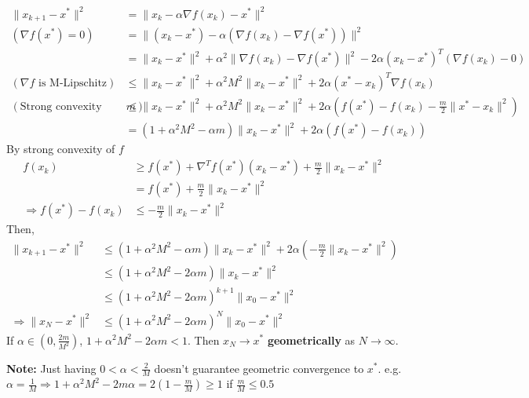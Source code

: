 \documentclass[11pt,a4paper]{article}
\begin{document}
\begin{equation}
    \begin{aligned}
        \|x_{k+1}-x^*\|^2&=\|x_k-\alpha \nabla f(x_k)-x^*\|^2\\
        (\nabla f(x^*)=0)\quad \quad &=\|(x_k-x^*)-\alpha (\nabla f(x_k)-\nabla f(x^*))\|^2\\
        &=\|x_k-x^*\|^2+\alpha^2\|\nabla f(x_k)-\nabla f(x^*)\|^2-2\alpha(x_k-x^*)^T(\nabla f(x_k)-0)\\
        (\nabla f\text{ is M-Lipschitz})\quad \quad &\leq \|x_k-x^*\|^2+\alpha^2M^2\|x_k-x^*\|^2+2\alpha(x^*-x_k)^T\nabla f(x_k)\\
        (\text{Strong convexity with $m$})\quad &\leq \|x_k-x^*\|^2+\alpha^2M^2\|x_k-x^*\|^2+2\alpha(f(x^*)-f(x_k)-\frac{m}{2}\|x^*-x_k\|^2)\\
        &=(1+\alpha^2M^2-\alpha m)\|x_k-x^*\|^2+2\alpha (f(x^*)-f(x_k))
    \end{aligned}
    \nonumber
\end{equation}
By strong convexity of $f$
\begin{equation}
    \begin{aligned}
        f(x_k)&\geq f(x^*)+\nabla^T f(x^*)(x_k-x^*)+\frac{m}{2}\|x_k-x^*\|^2\\
        &= f(x^*)+\frac{m}{2}\|x_k-x^*\|^2\\
        \Rightarrow	f(x^*)-f(x_k)&\leq -\frac{m}{2}\|x_k-x^*\|^2
    \end{aligned}
    \nonumber
\end{equation}
Then,
\begin{equation}
    \begin{aligned}
        \|x_{k+1}-x^*\|^2&\leq (1+\alpha^2M^2-\alpha m)\|x_k-x^*\|^2+2\alpha (-\frac{m}{2}\|x_k-x^*\|^2)\\
        &\leq (1+\alpha^2M^2-2\alpha m)\|x_k-x^*\|^2\\
        &\leq (1+\alpha^2M^2-2\alpha m)^{k+1}\|x_0-x^*\|^2\\
        \Rightarrow	\|x_{N}-x^*\|^2&\leq (1+\alpha^2M^2-2\alpha m)^N\|x_0-x^*\|^2
    \end{aligned}
    \nonumber
\end{equation}
If $\alpha\in(0,\frac{2m}{M^2})$, $1+\alpha^2M^2-2\alpha m<1$. Then $x_N \rightarrow x^*$ \textbf{geometrically} as $N \rightarrow \infty$.

\textbf{Note: }Just having $0<\alpha<\frac{2}{M}$ doesn't guarantee geometric convergence to $x^*$. e.g. $\alpha=\frac{1}{M} \Rightarrow 1+\alpha^2M^2-2m\alpha=2(1-\frac{m}{M})\geq 1$ if $\frac{m}{M}\leq 0.5$
\end{document}

